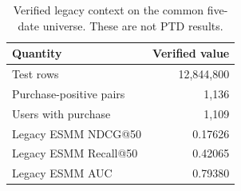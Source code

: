 \begin{table}[t]
\caption{Verified legacy context on the common five-date universe. These are not PTD results.}
\label{tab:legacy}
\centering
\begin{tabular}{lr}
\toprule
Quantity & Verified value \\
\midrule
Test rows & 12,844,800 \\
Purchase-positive pairs & 1,136 \\
Users with purchase & 1,109 \\
Legacy ESMM NDCG@50 & 0.17626 \\
Legacy ESMM Recall@50 & 0.42065 \\
Legacy ESMM AUC & 0.79380 \\
\bottomrule
\end{tabular}
\end{table}
